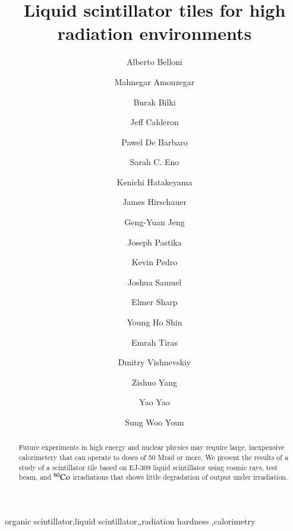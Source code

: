 \documentclass[review]{elsarticle}
\begin{document}
\begin{frontmatter}

\title{Liquid scintillator tiles for high radiation environments }


\author[umd]{Alberto Belloni}
\author[umd]{Mahnegar Amouzegar}
\author[iowa]{Burak Bilki}
\author[umd]{Jeff Calderon}
\author[rochester]{Pawel De Barbaro}
\author[umd]{Sarah C. Eno}
\author[baylor]{Kenichi Hatakeyama}
\author[fnal]{James Hirschauer}
\author[umd]{Geng-Yuan Jeng}
\author[baylor]{Joseph Pastika}
\author[fnal]{Kevin Pedro}
\author[umd]{Joshua Samuel}
\author[elmer]{Elmer Sharp}
\author[umd]{Young Ho Shin}
\author[baylor]{Emrah Tiras}
\author[rochester]{Dmitry Vishnevskiy}
\author[umd]{Zishuo Yang}
\author[umd]{Yao Yao}
\author[korea]{Sung Woo Youn}




\address[umd]{Dept. Physics, U. Maryland, College Park MD 30742 USA}
\address[eljen]{Eljen Technology, 1300 W. Broadway, Sweetwater, Tx 79556 USA}
\address[korea]{Institute for Basic Science, Center for Axion and Precision Physics Research, IBS Center for Axion and Precision Physics Research
Room 4315, Department of Physics, Natural Science Building (E6-2), KAIST,
291 Daehak-ro, Yuseong-gu, Daejeon 305-701, South Korea}
\address[elmer]{Elmer Sharp Engineering, 7007 Leesville Blvd. Springfield, VA 22151}
\address[fnal]{Fermi National Accelerator Laboratory, Batavia, IL, USA}
\address[baylor]{Baylor University, Waco, Texas, USA}
\address[iowa]{The University of Iowa, Iowa City, IA, USA}
\address[rochester]{The University of Rochester, Rochester, NY, USA}

\begin{abstract}
Future experiments in high energy and nuclear physics may require large, inexpensive calorimetery that can operate to doses of 50 Mrad or more.
We present the results of a study of a scintillator tile based on EJ-309 liquid scintillator using cosmic rays, test beam, and $\rm{^{60}Co}$ irradiations
that shows little degradation of output under irradiation.
\end{abstract}

\begin{keyword}
organic scintillator\sep liquid scintillator\sep \sep radiation hardness \sep calorimetry
\end{keyword}

\end{frontmatter}
\end{document}
